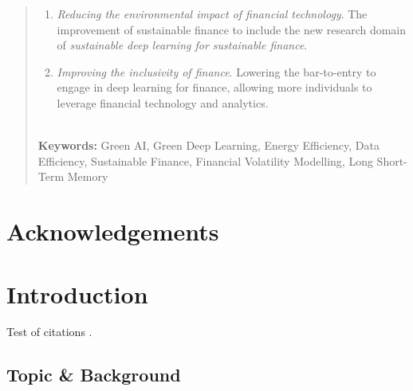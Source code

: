 \documentclass[a4paper, 12pt]{report}
\begin{document}
\begin{abstract}
\begin{enumerate}
            \item \emph{Reducing the environmental impact of financial technology}. The improvement of sustainable finance to include the new research domain of \emph{sustainable deep learning for sustainable finance}. 

            \item \emph{Improving the inclusivity of finance}. Lowering the bar-to-entry to engage in deep learning for finance,  allowing more individuals to leverage financial technology and analytics.
        \end{enumerate}
        
        \textbf{\\Keywords:} Green AI, Green Deep Learning, Energy Efficiency, Data Efficiency, Sustainable Finance, Financial Volatility Modelling, Long Short-Term Memory

    \end{abstract}


    \newpage
    \chapter*{Acknowledgements}
    \blindtext 


    \newpage
    \tableofcontents


    \newpage 
    \listoffigures


    \newpage
    \listoftables 




    \newpage
    \chapter{Introduction}
    \label{chapter: intro}

    Test of citations \citep{xu-2021}.

    \section{Topic \& Background}
    \label{section: topic}
\end{document}
